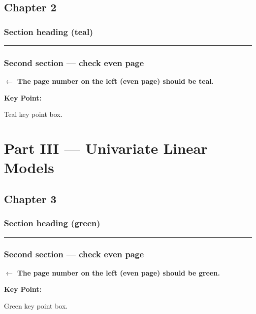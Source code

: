 \documentclass[
  twoside,
  10pt]{book}
\newcommand{\partrule}{%
  \textcolor{partcol}{\rule{\linewidth}{0.8pt}}}
\newenvironment{keypoint}{%
  \begin{mdframed}[style=keypointbox]%
  \textcolor{partcol}{\textbf{Key Point:}}\space
}{\end{mdframed}}
\begin{document}
\chapter{Chapter 2}\label{chapter-2}

\section{Section heading (teal)}\label{section-heading-teal}

\partrule

\lipsum[1-4]

\section{Second section --- check even
page}\label{second-section-check-even-page-1}

\textbf{$\leftarrow$ The page number on the left (even page) should be teal.}

\lipsum[5-6]

\begin{keypoint}
Teal key point box.
\end{keypoint}

\part{Part III — Univariate Linear Models}

\chapter{Chapter 3}\label{chapter-3}

\section{Section heading (green)}\label{section-heading-green}

\partrule

\lipsum[1-4]

\section{Second section --- check even
page}\label{second-section-check-even-page-2}

\textbf{$\leftarrow$ The page number on the left (even page) should be green.}

\lipsum[5-6]

\begin{keypoint}
Green key point box.
\end{keypoint}
\end{document}
